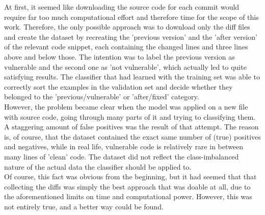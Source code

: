 \documentclass[
a4paper,
pagesize,
pdftex,
12pt,
twoside, %
BCOR=5mm, %
ngerman,
fleqn,
final,
]{scrartcl}
\begin{document}
	At first, it seemed like downloading the source code for each commit would require far too much computational effort and therefore time for the scope of this work. Therefore, the only possible approach was to download only the diff files and create the dataset by recreating the 'previous version' and the 'after version' of the relevant code snippet, each containing the changed lines and three lines above and below those. The intention was to label the previous version as vulnerable and the second one as 'not vulnerable', which actually led to quite satisfying results. The classifier that had learned with the training set was able to correctly sort the examples in the validation set and decide whether they belonged to the 'previous/vulnerable' or 'after/fixed' category.\\
	However, the problem became clear when the model was applied on a new file with source code, going through many parts of it and trying to classifying them. A staggering amount of false positives was the result of that attempt. The reason is, of course, that the dataset contained the exact same number of (true) positives and negatives, while in real life, vulnerable code is relatively rare in between many lines of 'clean' code. The dataset did not reflect the class-imbalanced nature of the actual data the classifier should be applied to.\\
	Of course, this fact was obvious from the beginning, but it had seemed that that collecting the diffs was simply the best approach that was doable at all, due to the aforementioned limits on time and computational power. However, this was not entirely true, and a better way could be found.
		
\end{document}
